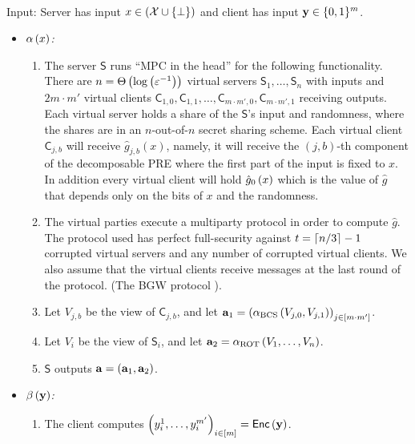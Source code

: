\documentclass{llncs}
\newcommand{\ROT}{\operatorname{ROT}}
\newcommand{\stb}{\operatorname{BCS}}
\newcommand{\X}{\mathcal{X}}
\renewcommand{\a}{\myvec{a}}
\newcommand{\y}{\myvec{y}}
\newcommand{\srvr}{\alpha}
\newcommand{\clnt}{\beta}
\newcommand{\IKOPS}{\operatorname{IKOPS}}
\renewcommand{\Sc}{\mathsf{S}}
\newcommand{\Cc}{\mathsf{C}}
\renewcommand{\Enc}{\mathsf{Enc}}
\begin{document}
\begin{protocol}[$\Pi^+_{\IKOPS}\of{\eps}$]~

Input: Server has input $x\in(\X\cup\set{\bot})$ and client has input $\y\in\zo^m$.
    
\begin{itemize}
	\item$\srvr\of{x}$\emph{:} 
    \begin{enumerate}
    	\item The server $\Sc$ runs ``MPC in the head'' for the following functionality. There are  $n=\Theta\left ( \log\left ( \varepsilon^{-1} \right ) \right )$ virtual servers $\Sc_1,\ldots,\Sc_n$ with inputs and $2m\cdot m'$ virtual clients $\Cc_{1,0},\Cc_{1,1},\ldots,\Cc_{m\cdot m',0},\Cc_{m\cdot m',1}$ receiving outputs. Each virtual server holds a share of the $\Sc$'s input and randomness, where the shares are in an $n$-out-of-$n$ secret sharing scheme. Each virtual client $\Cc_{j,b}$ will receive $\hat{g}_{j,b}(x)$, namely, it will receive the $(j,b)$-th component of the decomposable PRE where the first part of the input is fixed to $x$. In addition every virtual client will hold $\hat{g}_0\left ( x \right )$ which is the value of $\hat{g}$ that depends only on the bits of $x$ and the randomness.
        
        \item The virtual parties execute a multiparty protocol in order to compute $\hat{g}$. The protocol used has perfect full-security against $t=\left\lceil n/3 \right\rceil-1$ corrupted virtual servers and any number of corrupted virtual clients. We also assume that the virtual clients receive messages at the last round of the protocol. (\eg The BGW protocol \cite{BGW88}).
        
        \item Let $V_{j,b}$ be the view of $\Cc_{j,b}$, and let $\a_1=\vect{\srvr_{\stb}\of{V_{j,0},V_{j,1}}}_{j\in[m\cdot m']}$.
        
        \item Let $V_i$ be the view of $\Sc_i$, and let $\a_2=\srvr_{\ROT}\of{V_1,\ldots,V_n}$.
        
        \item $\Sc$ outputs $\a=(\a_1,\a_2)$.
    \end{enumerate}
    
    
    \item$\clnt\of{\y}$\emph{:}
    \begin{enumerate}
    	\item The client computes $\vect{y_i^1,\ldots,y_i^{m'}}_{i\in[m]}=\Enc\of{\y}$.
        

\end{enumerate}
\end{itemize}
\end{protocol}
\end{document}
